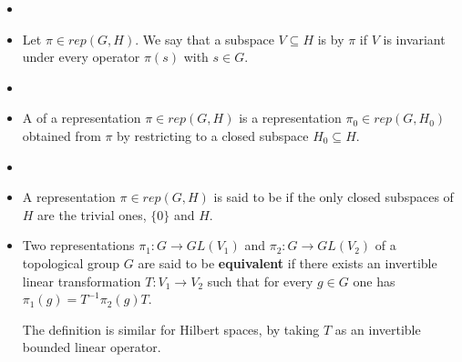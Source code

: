 \documentclass[12pt]{article}
\begin{document}
\begin{itemize}
\item \item Let $\pi \in rep(G,H)$. We say that a subspace $V \subseteq H$ is {\bf {}} by $\pi$ if $V$ is invariant under every operator $\pi(s)$ with $s \in G$.
\end{itemize}
\begin{itemize}
\item \item A {\bf {}} of a representation $\pi \in rep(G,H)$ is a representation $\pi_0 \in rep(G,H_0)$ obtained from $\pi$ by restricting to a closed  subspace $H_0 \subseteq H$.
\end{itemize}
\begin{itemize}
\item \item A representation $\pi \in rep(G,H)$ is said to be {\bf {}} if the only closed  subspaces of $H$ are the trivial ones, $\{0\}$ and $H$.
\end{itemize}
\begin{itemize}
\item Two representations $\pi_1:G \longrightarrow GL(V_1)$ and $\pi_2:G \longrightarrow GL(V_2)$ of a topological group $G$ are said to be {\bf equivalent} if there exists an invertible linear transformation $T:V_1 \longrightarrow V_2$ such that for every $g \in G$ one has $\pi_1(g) = T^{-1} \pi_2(g) T$.

The definition is similar for Hilbert spaces, by taking $T$ as an invertible bounded linear operator.
\end{itemize}
\end{document}
